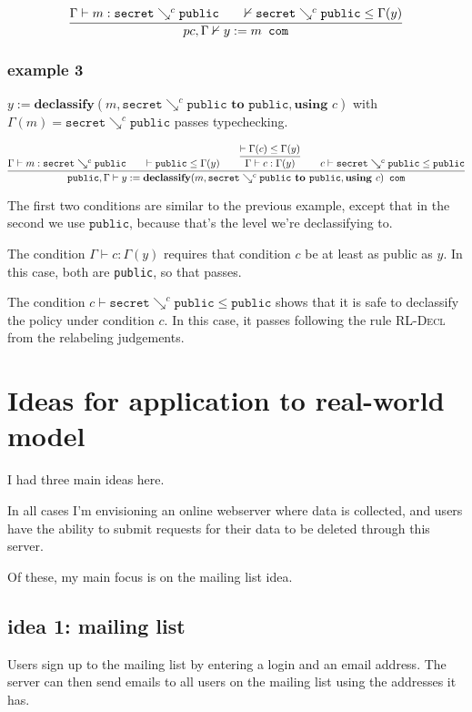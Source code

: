 \documentclass[11pt, oneside]{article}   	%
\begin{document}
\[\infer{pc, \Gamma \nvdash y:=m \texttt{ com}}
	  {\Gamma\vdash m:\texttt{secret} \searrow ^{c}\texttt{public} &&
	  \nvdash \texttt{secret} \searrow ^{c}\texttt{public} \le \Gamma(y)}
	  {}\]

\subsubsection{example 3}
$y:=\textbf{declassify}(m, \texttt{secret} \searrow ^{c}\texttt{public} \textbf{ to } \texttt{public}, \textbf{using } c)$ with $\Gamma(m)=\texttt{secret} \searrow ^{c}\texttt{public}$ passes typechecking.

\[\infer{\texttt{public}, \Gamma \vdash y:=\textbf{declassify}(m, \texttt{secret} \searrow ^{c}\texttt{public} \textbf{ to } \texttt{public}, \textbf{using } c) \texttt{ com}}
	  {\Gamma\vdash m:\texttt{secret} \searrow ^{c}\texttt{public} &&
	    \vdash \texttt{public} \le \Gamma(y) &&
	    \infer{\Gamma \vdash c : \Gamma(y)}
	            {\vdash \Gamma(c) \le \Gamma(y)}
	            {}
	    &&
	    c \vdash \texttt{secret} \searrow ^{c}\texttt{public} \le \texttt{public} }{}{}
	  {}\]

The first two conditions are similar to the previous example, except that in the second we use $\texttt{public}$, because that's the level we're declassifying to.

The condition $\Gamma\vdash c : \Gamma(y)$ requires that condition $c$ be at least as public as $y$. In this case, both are \texttt{public}, so that passes.

The condition $c \vdash \texttt{secret} \searrow ^{c}\texttt{public} \le \texttt{public} $ shows that it is safe to declassify the policy under condition $c$. In this case, it passes following the rule \textsc{RL-Decl} from the relabeling judgements.

\section{Ideas for application to real-world model}

I had three main ideas here.

In all cases I'm envisioning an online webserver where data is collected, and users have the ability to submit requests for their data to be deleted through this server.

Of these, my main focus is on the mailing list idea.

\subsection{idea 1: mailing list}
Users sign up to the mailing list by entering a login and an email address. The server can then send emails to all users on the mailing list using the addresses it has. 
\end{document}
